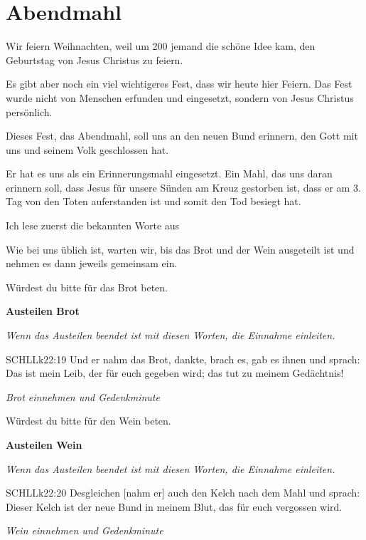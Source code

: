 \section{Abendmahl}
Wir feiern Weihnachten, weil um 200\nChr{} jemand die schöne Idee kam, den Geburtstag von Jesus Christus zu feiern.

Es gibt aber noch ein viel wichtigeres Fest, dass wir heute hier Feiern. Das Fest wurde nicht von Menschen erfunden und eingesetzt, sondern von Jesus Christus persönlich.

Dieses Fest, das Abendmahl, soll uns an den neuen Bund erinnern, den Gott mit uns und seinem Volk geschlossen hat.

Er hat es uns als ein Erinnerungsmahl eingesetzt. Ein Mahl, das uns daran erinnern soll, dass Jesus für unsere Sünden am Kreuz gestorben ist, dass er am 3. Tag von den Toten auferstanden ist und somit den Tod besiegt hat.

Ich lese zuerst die bekannten Worte aus

Wie bei uns üblich ist, warten wir, bis das Brot und der Wein ausgeteilt ist und nehmen es dann jeweils gemeinsam ein.

Würdest du bitte für das Brot beten.


{\textbf{Austeilen Brot}}

\textit{Wenn das Austeilen beendet ist mit diesen Worten, die Einnahme einleiten. }
\begin{bibelbox}{SCHL}{Lk}{22:19}
Und er nahm das Brot, dankte, brach es, gab es ihnen und sprach: Das ist mein Leib, der für euch gegeben wird; das tut zu meinem Gedächtnis!
\end{bibelbox}

\textit{Brot einnehmen und Gedenkminute}


Würdest du bitte für den Wein beten. 


{\textbf{Austeilen Wein}}

\textit{Wenn das Austeilen beendet ist mit diesen Worten, die Einnahme einleiten. }
\begin{bibelbox}{SCHL}{Lk}{22:20}
Desgleichen [nahm er] auch den Kelch nach dem Mahl und sprach: Dieser Kelch ist der neue Bund in meinem Blut, das für euch vergossen wird.
\end{bibelbox}

\textit{Wein einnehmen und Gedenkminute}